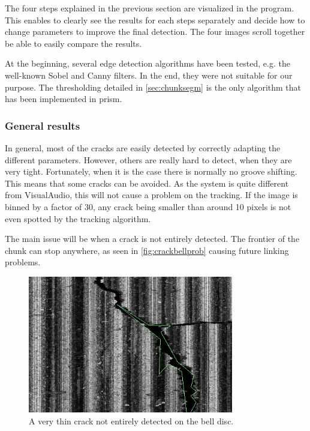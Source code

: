 The four steps explained in the previous section are visualized in the program. This enables to clearly see the results for each steps separately and decide how to change parameters to improve the final detection. The four images scroll together be able to easily compare the results.

At the beginning, several edge detection algorithms have been tested, e.g. the well-known Sobel and Canny filters. In the end, they were not suitable for our purpose. The thresholding detailed in \autoref{sec:chunksegm} is the only algorithm that has been implemented in \gls{prism}.

\subsubsection{General results}

In general, most of the cracks are easily detected by correctly adapting the different parameters. However, others are really hard to detect, when they are very tight. Fortunately, when it is the case there is normally no groove shifting. This means that some cracks can be avoided. As the system is quite different from VisualAudio, this will not cause a problem on the tracking. If the image is binned by a factor of 30, any crack being smaller than around 10 pixels is not even spotted by the tracking algorithm.

The main issue will be when a crack is not entirely detected. The frontier of the chunk can stop anywhere, as seen in \autoref{fig:crackbellprob} causing future linking problems.

\begin{figure}[!ht]
\centering
\includegraphics[width=0.8\textwidth]{images/crack-bell-prob}
\caption{A very thin crack not entirely detected on the bell disc.}
\label{fig:crackbellprob}
\end{figure}

